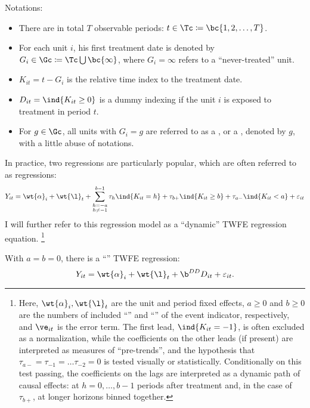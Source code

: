 \documentclass[12pt]{article}
\newcommand{\highlightB}[1]{{\emph{\color{MyBlue}{#1}}}}
\theoremstyle{definition}
\begin{document}
Notations:
\begin{itemize}[topsep=0pt, leftmargin=20pt, itemsep=0pt]
	\setlength{\parskip}{10pt} 
	\item There are in total $T$ observable periods: $t \in \Tc \coloneqq \bc{1, 2, \ldots, T}$.
	\item For each unit $i$, his first treatment date is denoted by $G_i \in \Gc \coloneqq \Tc \bigcup \bc{\infty}$, where $G_i = \infty$ refers to a ``never-treated'' unit.
	\item $K_{it} = t - G_i$ is the relative time index to the treatment date. 
	\item $D_{it} = \ind{K_{it} \geq 0}$ is a dummy indexing if the unit $i$ is exposed to treatment in period $t$.
	\item For $g \in \Gc$, all units with $G_i = g$ are referred to as a \highlightB{cohort}, or a \highlightB{timing group}, denoted by $g$, with a little abuse of notations.
\end{itemize}

In practice, two regressions are particularly popular, which are often referred to as \highlightB{Two-Way Fixed Effects (TWFE)} regressions: 
\begin{equation}
    \label{2}
    Y_{i t} = \wt{\alpha}_i + \wt{\l}_t + \sum_{\substack{h=-a \\ h \neq-1}}^{b-1} \tau_h \ind{K_{i t}=h} + \tau_{b+} \ind{K_{i t} \geq b} + \tau_{a-} \ind{K_{i t} < a}  + \varepsilon_{i t}
\end{equation}
I will further refer to this regression model as a ``dynamic'' TWFE regression equation. \footnote{Here, $\wt{\alpha}_i, \wt{\l}_t$ are the unit and period fixed effects, $a \geq 0$ and $b \geq 0$ are the numbers of included ``\highlightB{leads}'' and ``\highlightB{lags}'' of the event indicator, respectively, and $\ve_{it}$ is the error term. The first lead, $\ind{K_{it} = -1}$, is often excluded as a normalization, while the coefficients on the other leads (if present) are interpreted as measures of ``pre-trends'', and the hypothesis that $\tau_{a-} = \tau_{-1} = \ldots \tau_{-2} = 0$ is tested visually or statistically. Conditionally on this test passing, the coefficients on the lags are interpreted as a dynamic path of causal effects: at $h=0, \ldots, b-1$ periods after treatment and, in the case of $\tau_{b+}$, at longer horizons binned together. }

With $a=b=0$, there is a ``\highlightB{static}'' TWFE regression:
\begin{equation}
    \label{3}
    Y_{i t} = \wt{\alpha}_i + \wt{\l}_t + \b^{DD} D_{i t} + \varepsilon_{i t} .
\end{equation}
\end{document}
